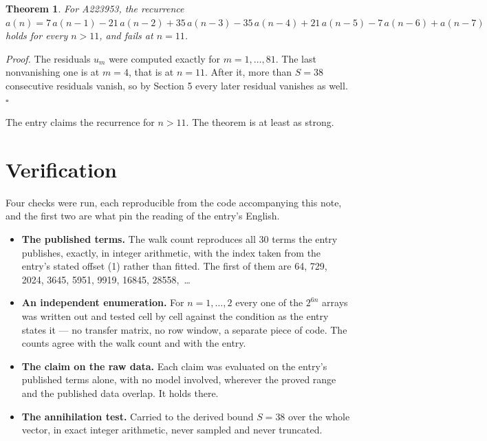 \documentclass[11pt]{article}
\newtheorem{theorem}{Theorem}
\theoremstyle{definition}
\begin{document}
\begin{theorem} For A223953, the recurrence $a(n) = 7\,a(n-1) - 21\,a(n-2) + 35\,a(n-3) - 35\,a(n-4) + 21\,a(n-5) - 7\,a(n-6) + a(n-7)$ holds for every $n > 11$, and fails at $n = 11$.\end{theorem}

{\itshape Proof.} The residuals $u_m$ were computed exactly for $m = 1,\dots,81$. The last nonvanishing one is at $m = 4$, that is at $n = 11$. After it, more than $S = 38$ consecutive residuals vanish, so by Section 5 every later residual vanishes as well. $\square$

The entry claims the recurrence for $n > 11$. The theorem is at least as strong.

\section{Verification}

Four checks were run, each reproducible from the code accompanying this note, and the first two are what pin the reading of the entry's English.

\begin{itemize}

\item {\bfseries The published terms.} The walk count reproduces all 30 terms the entry publishes, exactly, in integer arithmetic, with the index taken from the entry's stated offset (1) rather than fitted. The first of them are 64, 729, 2024, 3645, 5951, 9919, 16845, 28558,~\dots

\item {\bfseries An independent enumeration.} For $n = 1,\dots,2$ every one of the $2^{6n}$ arrays was written out and tested cell by cell against the condition as the entry states it --- no transfer matrix, no row window, a separate piece of code. The counts agree with the walk count and with the entry.

\item {\bfseries The claim on the raw data.} Each claim was evaluated on the entry's published terms alone, with no model involved, wherever the proved range and the published data overlap. It holds there.

\item {\bfseries The annihilation test.} Carried to the derived bound $S = 38$ over the whole vector, in exact integer arithmetic, never sampled and never truncated.

\end{itemize}
\end{document}
